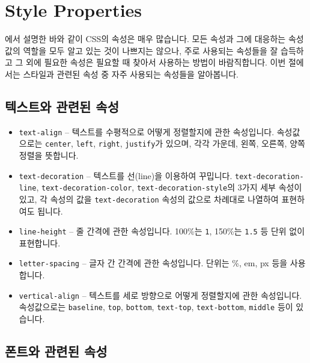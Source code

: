 \section{Style Properties} \label{sect:style-properties}

에서 설명한 바와 같이 CSS의 속성은 매우 많습니다. 모든 속성과 그에 대응하는 속성값의 역할을 모두 알고 있는 것이 나쁘지는 않으나, 주로 사용되는 속성들을 잘 습득하고 그 외에 필요한 속성은 필요할 때 찾아서 사용하는 방법이 바람직합니다. 이번 절에서는 스타일과 관련된 속성 중 자주 사용되는 속성들을 알아봅니다. 

\subsection*{텍스트와 관련된 속성}

\begin{itemize}
    \item \texttt{text-align} – 텍스트를 수평적으로 어떻게 정렬할지에 관한 속성입니다. 속성값으로는 \texttt{center}, \texttt{left}, \texttt{right}, \texttt{justify}가 있으며, 각각 가운데, 왼쪽, 오른쪽, 양쪽 정렬을 뜻합니다. 
    \item \texttt{text-decoration} – 텍스트를 선(line)을 이용하여 꾸밉니다. \texttt{text-decoration-line}, \texttt{text-decoration-color}, \texttt{text-decoration-style}의 3가지 세부 속성이 있고, 각 속성의 값을 \texttt{text-decoration} 속성의 값으로 차례대로 나열하여 표현하여도 됩니다.	
    \item \texttt{line-height} – 줄 간격에 관한 속성입니다. 100\%는 \texttt{1}, 150\%는 \texttt{1.5} 등 단위 없이 표현합니다. 
    \item \texttt{letter-spacing} – 글자 간 간격에 관한 속성입니다. 단위는 \%, em, px 등을 사용합니다. 
    \item \texttt{vertical-align} – 텍스트를 세로 방향으로 어떻게 정렬할지에 관한 속성입니다. 속성값으로는 \texttt{baseline}, \texttt{top}, \texttt{bottom}, \texttt{text-top}, \texttt{text-bottom}, \texttt{middle} 등이 있습니다. 
\end{itemize}

\subsection*{폰트와 관련된 속성}


